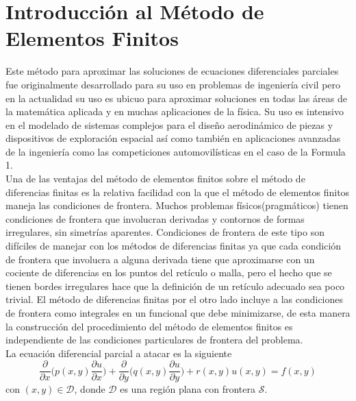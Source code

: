 \documentclass[a4paper]{article}
\begin{document}
\section{Introducción al Método de Elementos Finitos}
Este método para aproximar las soluciones de ecuaciones diferenciales parciales fue originalmente desarrollado para su uso en problemas de ingeniería civil pero en la actualidad su uso es ubicuo para aproximar soluciones en todas las áreas de la matemática aplicada y en muchas aplicaciones de la física. Su uso es intensivo en el modelado de sistemas complejos para el diseño aerodinámico de piezas y dispositivos de exploración espacial así como también en aplicaciones avanzadas de la ingeniería como las competiciones automovilísticas en el caso de la Formula 1. \\ 

Una de las ventajas del método de elementos finitos sobre el método de diferencias finitas es la relativa facilidad con la que el método de elementos finitos maneja las condiciones de frontera. Muchos problemas físicos(pragmáticos) tienen condiciones de frontera que involucran derivadas y contornos de formas irregulares, sin simetrías aparentes. Condiciones de frontera de este tipo son difíciles de manejar con los métodos de diferencias finitas ya que cada condición de frontera que involucra a alguna derivada tiene que aproximarse con un cociente de diferencias en los puntos del retículo o malla, pero el hecho que se tienen bordes irregulares hace que la definición de un retículo adecuado sea poco trivial. El método de diferencias finitas por el otro lado incluye a las condiciones de frontera como integrales en un funcional que debe minimizarse, de esta manera la construcción del procedimiento del método de elementos finitos es independiente de las condiciones particulares de frontera del problema.\\

La ecuación diferencial parcial a atacar es la siguiente
\begin{equation}\label{eq::partial_diff_equation}
\frac{\partial}{\partial x}\Bigg( p(x,y)\frac{\partial u}{\partial x} \Bigg) + \frac{\partial}{\partial y}\Bigg( q(x,y)\frac{\partial u}{\partial y} \Bigg) +r(x,y)u(x,y)=f(x,y)
\end{equation}
con $(x,y)\in \mathcal{D}$, donde $\mathcal{D}$ es una región plana con frontera $\mathcal{S}$.\\
\end{document}
